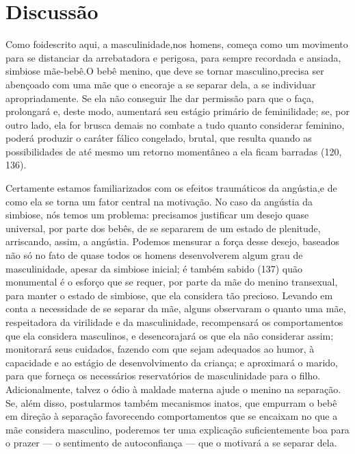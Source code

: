 \section{Discussão}

Como foi\idxangus[|(] descrito aqui, a masculinidade,\idxmascsu[|(] nos homens, começa como um
movimento para se distanciar da arrebatadora e perigosa, para sempre
recordada e ansiada, simbiose mãe-bebê.\idxmascupap[|(] O bebê menino, que deve se
tornar masculino,\idxmaesmasc[|(] precisa ser abençoado com uma mãe que o encoraje a se
separar dela, a se individuar apropriadamente. Se ela não conseguir lhe
dar permissão para que o faça, prolongará e, deste modo, aumentará seu
estágio primário de feminilidade; se, por outro lado, ela for brusca
demais no combate a tudo quanto considerar feminino, poderá produzir o
caráter fálico congelado, brutal, que resulta quando as possibilidades
de até mesmo um retorno momentâneo a ela ficam barradas (120, 136).

Certamente estamos familiarizados com os efeitos traumáticos da
angústia,\idxangusimb[|(] e de como ela se torna um fator central na motivação. No
caso da angústia da simbiose, nós temos um problema: precisamos
justificar um desejo quase universal, por parte dos bebês, de se
separarem de um estado de plenitude, arriscando, assim, a angústia.
Podemos mensurar a força desse desejo, baseados não só no fato de quase
todos os homens desenvolverem algum grau de masculinidade, apesar da
simbiose inicial; é também sabido (137) quão monumental é o esforço que
se requer, por parte da mãe\idxmaesfilh{} do menino transexual, para manter o estado
de simbiose, que ela considera tão precioso. Levando em conta a
necessidade de se separar da mãe, alguns observaram o quanto uma mãe,
respeitadora da virilidade e da masculinidade, recompensará os
comportamentos que ela considera masculinos, e desencorajará os que ela
não considerar assim; monitorará seus cuidados, fazendo com que sejam
adequados ao humor, à capacidade e ao estágio de desenvolvimento da
criança; e aproximará o marido, para que forneça os necessários
reservatórios de masculinidade para o filho. Adicionalmente, talvez o
ódio à maldade materna\idxmaesmald{} ajude o menino na separação. Se, além disso,
postularmos também mecanismos inatos, que empurram o bebê em direção
à separação favorecendo comportamentos que se encaixam no que a mãe
considera masculino, poderemos ter uma explicação suficientemente boa
para o prazer --- o sentimento de autoconfiança --- que o motivará a se
separar dela.


